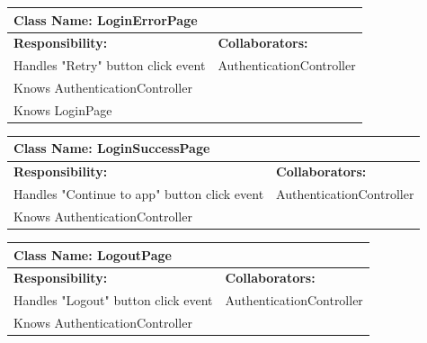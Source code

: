 \documentclass[]{article}
\begin{document}
	\begin{table}[H]
	\centering
	\begin{tabular}{|p{6cm}|p{6cm}|}
	\hline 
		\multicolumn{2}{|l|}{\textbf{Class Name: LoginErrorPage}} \\
	\hline
	\textbf{Responsibility:} & \textbf{Collaborators:} \\
	\hline
	Handles "Retry" button click event  & AuthenticationController\\ \hline 
	Knows AuthenticationController &\\ \hline
	Knows LoginPage &\\ \hline
	\end{tabular}
	\end{table}

	
	\begin{table}[H]
	\centering
	\begin{tabular}{|p{6cm}|p{6cm}|}
	\hline 
		\multicolumn{2}{|l|}{\textbf{Class Name: LoginSuccessPage}} \\
	\hline
	\textbf{Responsibility:} & \textbf{Collaborators:} \\
	\hline
	Handles "Continue to app" button click event&AuthenticationController\\ \hline
	Knows AuthenticationController &\\ \hline
	\end{tabular}
	\end{table}
	

	\begin{table}[H]
	\centering
	\begin{tabular}{|p{6cm}|p{6cm}|}
	\hline 
		\multicolumn{2}{|l|}{\textbf{Class Name: LogoutPage}} \\
	\hline
	\textbf{Responsibility:} & \textbf{Collaborators:} \\
	\hline 
	Handles "Logout" button click event  & AuthenticationController\\ \hline
	Knows AuthenticationController & \\ \hline
	\end{tabular}
	\end{table}

\appendix
\end{document}
